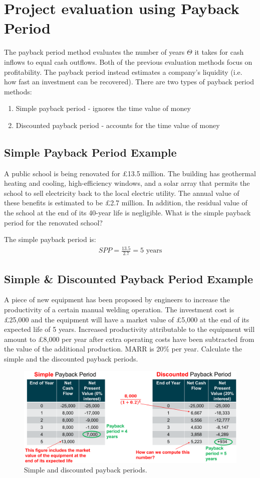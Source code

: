 \section{Project evaluation using Payback Period}
The payback period method evaluates the number of years $\Theta$ it takes for cash inflows to equal cash outflows. Both of the previous evaluation methods focus on profitability. The payback period instead estimates a company's liquidity (i.e. how fast an investment can be recovered). There are two types of payback period methods:
\begin{enumerate}
  \item Simple payback period - ignores the time value of money
  \item Discounted payback period - accounts for the time value of money
\end{enumerate}
\subsection{Simple Payback Period Example}
A public school is being renovated for \pounds 13.5 million. The building has geothermal heating and cooling, high-efficiency windows, and a solar array that permits the school to sell electricity back to the local electric utility. The annual value of these benefits is estimated to be \pounds 2.7 million. In addition, the residual value of the school at the end of its 40-year life is negligible. What is the simple payback period for the renovated school?

The simple payback period is:
\begin{gather}
  SPP = \frac{13.5}{2.7} = 5 \textrm{ years}
\end{gather}
\subsection{Simple \& Discounted Payback Period Example}
A piece of new equipment has been proposed by engineers to increase the productivity of a certain manual welding operation. The investment cost is \pounds 25,000 and the equipment will have a market value of \pounds 5,000 at the end of its expected life of 5 years. Increased productivity attributable to the equipment will amount to \pounds 8,000 per year after extra operating costs have been subtracted from the value of the additional production. MARR is 20\% per year. Calculate the simple and the discounted payback periods.
\begin{figure}[H]
  \centering
  \includegraphics[width = \textwidth]{./img/figure24.png}
  \caption{Simple and discounted payback periods.}
\end{figure}
